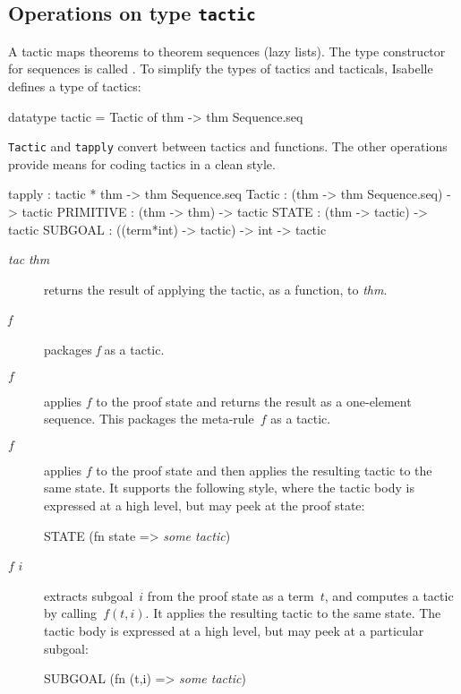 \subsection{Operations on type {\tt tactic}}
A tactic maps theorems to theorem sequences (lazy lists).  The type
constructor for sequences is called .  To simplify the
types of tactics and tacticals, Isabelle defines a type of tactics:
\begin{ttbox} 
datatype tactic = Tactic of thm -> thm Sequence.seq
\end{ttbox} 
{\tt Tactic} and {\tt tapply} convert between tactics and functions.  The
other operations provide means for coding tactics in a clean style.
\begin{ttbox} 
tapply    : tactic * thm -> thm Sequence.seq
Tactic    :     (thm -> thm Sequence.seq) -> tactic
PRIMITIVE :                  (thm -> thm) -> tactic  
STATE     :               (thm -> tactic) -> tactic
SUBGOAL   : ((term*int) -> tactic) -> int -> tactic
\end{ttbox} 
\begin{description}
\item[ {\it tac} {\it thm}]  
returns the result of applying the tactic, as a function, to {\it thm}.

\item[ {\it f}]  
packages {\it f} as a tactic.

\item[ $f$] 
applies $f$ to the proof state and returns the result as a
one-element sequence.  This packages the meta-rule~$f$ as a tactic.

\item[ $f$] 
applies $f$ to the proof state and then applies the resulting tactic to the
same state.  It supports the following style, where the tactic body is
expressed at a high level, but may peek at the proof state:
\begin{ttbox} 
STATE (fn state => {\it some tactic})
\end{ttbox} 

\item[ $f$ $i$] 
extracts subgoal~$i$ from the proof state as a term~$t$, and computes a
tactic by calling~$f(t,i)$.  It applies the resulting tactic to the same
state.  The tactic body is expressed at a high level, but may peek at a
particular subgoal:
\begin{ttbox} 
SUBGOAL (fn (t,i) => {\it some tactic})
\end{ttbox} 
\end{description}


